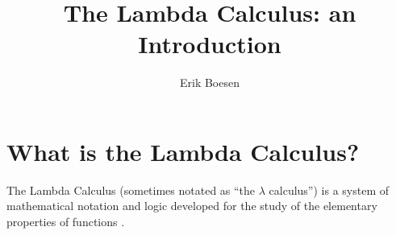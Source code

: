 \documentclass{article}
\begin{document}
\title{The Lambda Calculus: an Introduction}
\author{Erik Boesen}
\maketitle

\section{What is the Lambda Calculus?}
The Lambda Calculus (sometimes notated as ``the $\lambda$ calculus'') is a system of mathematical notation and logic developed for the study of the elementary properties of functions \cite{rojastutorial}.


\end{document}
